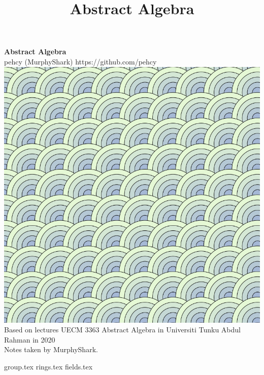 \documentclass[11pt,twoside]{report}
\title{Abstract Algebra}
\begin{document}
\begin{titlepage}
  \centering
  \vfill
  {\Large
      \textbf{Abstract Algebra}\\
      \vskip2cm
      pehcy (MurphyShark) \quad \textsf{https://github.com/pehcy} \\
  }    
  \vfill
  \includegraphics[width=0.55\paperwidth]{./src/images/wave.png} %
  \vskip2cm
  {
    Based on lectures UECM 3363 Abstract Algebra in Universiti Tunku Abdul Rahman in 2020\\
    Notes taken by MurphyShark.
  }
  \vfill
  \vfill
\end{titlepage}
  \newpage
  {group.tex}
  {rings.tex}
  {fields.tex}
\end{document}
